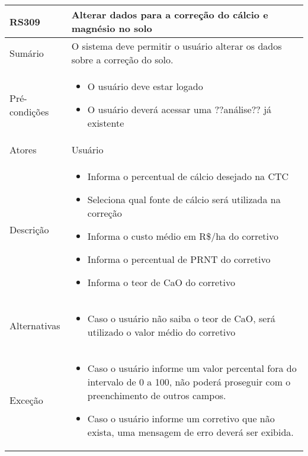 \begin{quadro}[!htb]
    \begin{tabular}{|p{3cm}|p{11cm}|}
        \hline
        \textbf{RS309} & \textbf{Alterar dados para a correção do cálcio e magnésio no solo} \\
        \hline
        Sumário        & O sistema deve permitir o usuário alterar os dados sobre a correção do solo.                  \\
        \hline
        Pré-condições  & \begin{itemize}
            \item O usuário deve estar logado
            \item O usuário deverá acessar uma ??análise?? já existente 
        \end{itemize}                 \\
        \hline
        Atores         & Usuário                  \\
        \hline
        Descrição      &
        \begin{itemize}
            \item Informa o percentual de cálcio desejado na CTC
            \item Seleciona qual fonte de cálcio será utilizada na correção
            \item Informa o custo médio em R\$/ha do corretivo
            \item Informa o percentual de PRNT do corretivo
            \item Informa o teor de CaO do corretivo
        \end{itemize}                 \\
        \hline
        Alternativas   &
        \begin{itemize}
            \item Caso o usuário não saiba o teor de CaO, será utilizado o valor médio do corretivo
        \end{itemize}                 \\
        \hline
        Exceção        &
        \begin{itemize}
            \item Caso o usuário informe um valor percental fora do intervalo de 0 a 100, não poderá proseguir com o preenchimento de outros campos.
            \item Caso o usuário informe um corretivo que não exista, uma mensagem de erro deverá ser exibida.
        \end{itemize}                   \\
        \hline
    \end{tabular}
\end{quadro}

